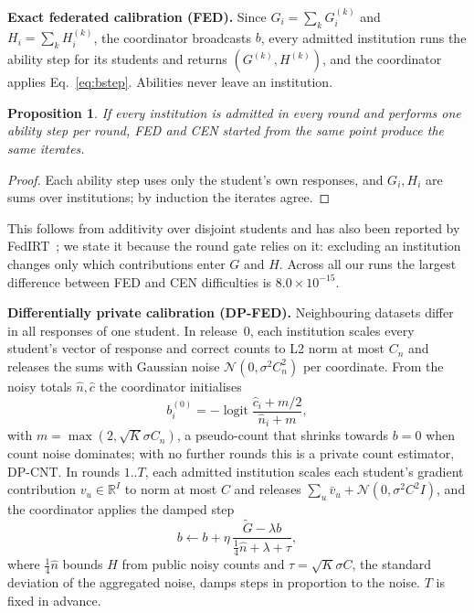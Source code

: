 \documentclass[pdflatex,iicol,sn-mathphys-num]{sn-jnl}
\theoremstyle{thmstyleone}
\newtheorem{proposition}[theorem]{Proposition}
\newcommand{\FedMaxDiff}{$8.0\times10^{-15}$}
\begin{document}
\textbf{Exact federated calibration (FED).} Since $G_i=\sum_k G_i^{(k)}$ and $H_i=\sum_k H_i^{(k)}$, the coordinator broadcasts $b$, every admitted institution runs the ability step for its students and returns $(G^{(k)},H^{(k)})$, and the coordinator applies Eq.~\eqref{eq:bstep}. Abilities never leave an institution.

\begin{proposition}\label{prop:exact}
If every institution is admitted in every round and performs one ability step per round, FED and CEN started from the same point produce the same iterates.
\end{proposition}
\begin{proof}
Each ability step uses only the student's own responses, and $G_i,H_i$ are sums over institutions; by induction the iterates agree.
\end{proof}
This follows from additivity over disjoint students and has also been reported by FedIRT~\cite{zhou2025federated}; we state it because the round gate relies on it: excluding an institution changes only which contributions enter $G$ and $H$. Across all our runs the largest difference between FED and CEN difficulties is \FedMaxDiff{}.

\textbf{Differentially private calibration (DP-FED).} Neighbouring datasets differ in all responses of one student. In release~0, each institution scales every student's vector of response and correct counts to L2 norm at most $C_n$ and releases the sums with Gaussian noise $\mathcal{N}(0,\sigma^2C_n^2)$ per coordinate. From the noisy totals $\hat n,\hat c$ the coordinator initialises
\begin{equation}\label{eq:warm}
b_i^{(0)}=-\operatorname{logit}\frac{\hat c_i+m/2}{\hat n_i+m},
\end{equation}
with $m=\max(2,\sqrt{K}\sigma C_n)$, a pseudo-count that shrinks towards $b=0$ when count noise dominates; with no further rounds this is a private count estimator, DP-CNT. In rounds $1..T$, each admitted institution scales each student's gradient contribution $v_u\in\mathbb{R}^I$ to norm at most $C$ and releases $\sum_u \bar v_u+\mathcal{N}(0,\sigma^2C^2 I)$, and the coordinator applies the damped step
\begin{equation}\label{eq:dpstep}
b\leftarrow b+\eta\,\frac{\tilde G-\lambda b}{\tfrac14\hat n+\lambda+\tau},
\end{equation}
where $\tfrac14\hat n$ bounds $H$ from public noisy counts and $\tau=\sqrt{K}\sigma C$, the standard deviation of the aggregated noise, damps steps in proportion to the noise. $T$ is fixed in advance.
\end{document}
